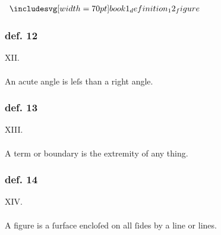 \hfill

\begin{minipage}{0.33\textwidth}
    \begin{center}
        $\img[0][0][70]{book1_definition_12_figure}$
    \end{center}
\end{minipage}%
\begin{minipage}{0.67\textwidth}
    \subsubsection{def. 12}
    \begin{center}
        XII.\label{book1def12}\\
        \hfill\\
        An acute angle is leſs than a right angle.
    \end{center}
\end{minipage}

\hfill

\begin{minipage}{0.33\textwidth}
    \phantom{}
\end{minipage}%
\begin{minipage}{0.67\textwidth}
    \subsubsection{def. 13}
    \begin{center}
        XIII.\label{book1def13}\\
        \hfill\\
        A term or boundary is the extremity of any thing.
    \end{center}
    \subsubsection{def. 14}
    \begin{center}
        XIV.\label{book1def14}\\
        \hfill\\
        A figure is a ſurface encloſed on all ſides by a line or lines.
    \end{center}
\end{minipage}

\hfill

